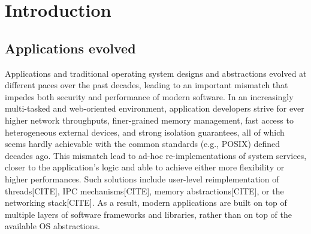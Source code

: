 \section{Introduction}

%	
%	

\subsection{Applications evolved}

Applications and traditional operating system designs and abstractions evolved at different paces over the past decades, leading to an important mismatch that impedes both security and performance of modern software.
In an increasingly multi-tasked and web-oriented environment, application developers strive for ever higher network throughputs, finer-grained memory management, fast access to heterogeneous external devices, and strong isolation guarantees, all of which seems hardly achievable with the common standards (e.g., POSIX) defined decades ago.
This mismatch lead to ad-hoc re-implementations of system services, closer to the application's logic and able to achieve either more flexibility or higher performances.
Such solutions include user-level reimplementation of threads[CITE], IPC mechanisms[CITE], memory abstractions[CITE], or the networking stack[CITE].
As a result, modern applications are built on top of multiple layers of software frameworks and libraries, rather than on top of the available OS abstractions.


